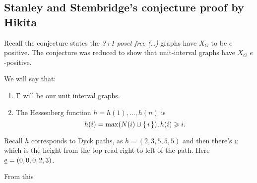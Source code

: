 \documentclass[12pt]{memoir}
\begin{document}
\subsection{Stanley and Stembridge's conjecture proof by Hikita}

Recall the conjecture states the \emph{3+1 poset free (\dots)} graphs have $X_G$ to be $e$ positive. The conjecture was reduced to show that unit-interval graphs have $X_G$ $e$-positive.

\begin{Notn}
We will say that:
\begin{enumerate}
    \item $\Gamma$ will be our unit interval graphs.
    \item The Hessenberg function $h=h(1),\dots,h(n)$ is 
    $$h(i)=\max(N(i)\cup\{\,i\,\}), h(i)\geqslant i.$$
\end{enumerate}
\end{Notn}

\begin{Ex}
    Recall $h$ corresponds to Dyck paths, as $h=(2,3,5,5,5)$ and then there's $\underline e$ which is the height from the top read right-to-left of the path. Here $\underline e=(0,0,0,2,3)$.
\end{Ex}

\begin{Def}
    From this 
\end{Def}
\ifx\nextra\undefined
\printindex
\else\fi
\nocite{*}


\end{document}
